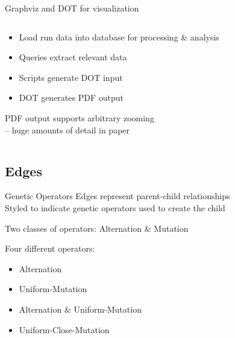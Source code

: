 \documentclass{beamer}
\begin{document}
\begin{frame}{Graphviz and DOT for visualization}
\begin{columns}
\begin{column}{.6\textwidth}
\begin{itemize}
    \setlength\itemsep{.5em}
	\item Load run data into database for processing \& analysis
    \item Queries extract relevant data
    \item Scripts generate DOT input
    \item DOT generates PDF output
\end{itemize}
\vspace{0.5cm}

PDF output supports arbitrary zooming \\ \hspace{.5cm} -- huge amounts of detail in paper
\end{column}
\begin{column}{.4\textwidth}
\end{column}
\end{columns}
\end{frame}

\subsection[Edges]{Edges}

\begin{frame}{Genetic Operators}
Edges represent parent-child relationships
\\
\vspace{.75em}
Styled to indicate genetic operators used to create the child
\\
\vspace{.75em}

Two classes of operators: Alternation \& Mutation
\\
\vspace{.75em}

Four different operators:
\begin{itemize}
\item Alternation %
\item Uniform-Mutation %
\item Alternation \& Uniform-Mutation
\item Uniform-Close-Mutation %
\end{itemize} 
\end{frame}
\end{document}

